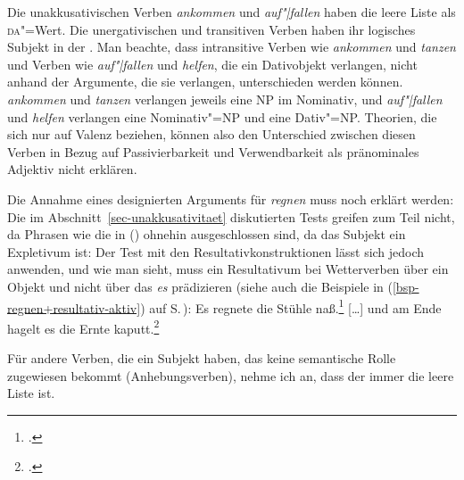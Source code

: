 \z
Die unakkusativischen Verben \emph{ankommen} und \emph{auf"|fallen} haben die leere Liste als \textsc{da}"=Wert.
Die unergativischen und transitiven Verben haben ihr logisches Subjekt in der \daliste.
Man beachte, dass intransitive Verben wie \emph{ankommen} und \emph{tanzen} und Verben
wie \emph{auf"|fallen} und \emph{helfen}, die ein Dativobjekt verlangen,
nicht anhand der Argumente, die sie verlangen, unterschieden werden können.
\Dh \emph{ankommen} und \emph{tanzen} verlangen jeweils eine NP im Nominativ, und \emph{auf"|fallen}
und \emph{helfen} verlangen eine Nominativ"=NP und eine Dativ"=NP.
Theorien, die sich nur auf Valenz beziehen, können also den Unterschied zwischen diesen
Verben in Bezug auf Passivierbarkeit und Verwendbarkeit als pränominales Adjektiv nicht erklären. 

Die Annahme eines designierten Arguments für \emph{regnen} muss noch erklärt werden:
Die im Abschnitt~\ref{sec-unakkusativitaet} diskutierten Tests greifen zum Teil nicht,
da Phrasen wie die in () ohnehin ausgeschlossen sind, da das Subjekt ein Expletivum ist:
\eal
{}
\zl
Der Test mit den Resultativkonstruktionen lässt sich jedoch anwenden, und wie man sieht,
muss ein Resultativum bei Wetterverben über ein Objekt und nicht über das \emph{es} prädizieren (siehe auch die Beispiele in
(\ref{bsp-regnen+resultativ-aktiv}) auf S.\,\pageref{bsp-regnen+resultativ-aktiv}):
\eal
\ex Es regnete die Stühle naß.\footnote{
  .
}
\ex {}[\ldots] und am Ende hagelt es die Ernte kaputt.\footnote{
.
}
\zl

\noindent
Für andere Verben, die ein Subjekt haben, das keine semantische Rolle zugewiesen bekommt (Anhebungsverben),
nehme ich an, dass der \daw immer die leere Liste ist.



